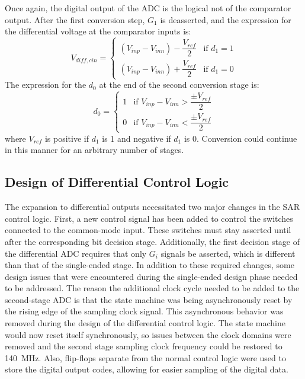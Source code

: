 Once again, the digital output of the ADC is the logical not of the comparator output. After the first conversion step, $G_{1}$ is deasserted, and the expression for the differential voltage at the comparator inputs is:
\begin{equation}
\label{eq:vdiffsarout}
V_{diff,cin} = \begin{cases}
				(V_{inp}-V_{inn}) - \dfrac{V_{ref}}{2} & \mbox{if } d_{1} = 1 \\[0.5em]
				(V_{inp}-V_{inn}) + \dfrac{V_{ref}}{2} & \mbox{if } d_{1} = 0
			\end{cases}
\end{equation}
The expression for the $d_{0}$ at the end of the second conversion stage is:
\begin{equation}
d_{0} =	\begin{cases}
				1 & \mbox{if } V_{inp}-V_{inn} > \dfrac{\pm V_{ref}}{2} \\[0.5em]
				0 & \mbox{if } V_{inp}-V_{inn} < \dfrac{\pm V_{ref}}{2}
			\end{cases}
\end{equation}
where $V_{ref}$ is positive if $d_{1}$ is 1 and negative if $d_{1}$ is 0. Conversion could continue in this manner for an arbitrary number of stages. 
\subsection{Design of Differential Control Logic}
The expansion to differential outputs necessitated two major changes in the SAR control logic. First, a new control signal has been added to control the switches connected to the common-mode input. These switches must stay asserted until after the corresponding bit decision stage. Additionally, the first decision stage of the differential ADC requires that only $G_{i}$ signals be asserted, which is different than that of the single-ended stage.  In addition to these required changes, some design issues that were encountered during the single-ended design phase needed to be addressed. The reason the additional clock cycle needed to be added to the second-stage ADC is that the state machine was being asynchronously reset by the rising edge of the sampling clock signal. This asynchronous behavior was removed during the design of the differential control logic. The state machine would now reset itself synchronously, so issues between the clock domains were removed and the second stage sampling clock frequency could be restored to \SI{140}{\mega\hertz}. Also, flip-flops separate from the normal control logic were used to store the digital output codes, allowing for easier sampling of the digital data. 

